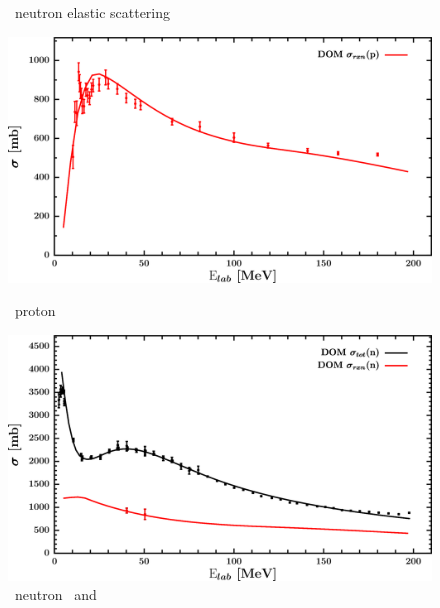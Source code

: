 \begin{figure}[hbtp]
\begin{minipage}{0.47\textwidth}
        \caption*{\caForty\ neutron elastic scattering}
        \label{DOMFitData_ca40_neutron_elastic}
    \end{minipage}
\end{figure}
\vspace{0.70in}
\begin{figure}[hbtp]
    \centering
    \begin{minipage}{0.47\textwidth}
        \centering
        \includegraphics[width=\linewidth]{figures/ca40_protonInelastic.png}
        \caption*{\caForty\ proton \rxn}
        \label{DOMFitData_ca40_proton_inelastic}
    \end{minipage}\hspace{6pt}
    \begin{minipage}{0.47\textwidth}
        \centering
        \includegraphics[width=\textwidth]{figures/ca40_neutronInelastic.png}
        \caption*{\caForty\ neutron \rxn\ and \tot}
        \label{DOMFitData_ca40_neutron_inelastic}
    \end{minipage}
\end{figure}
